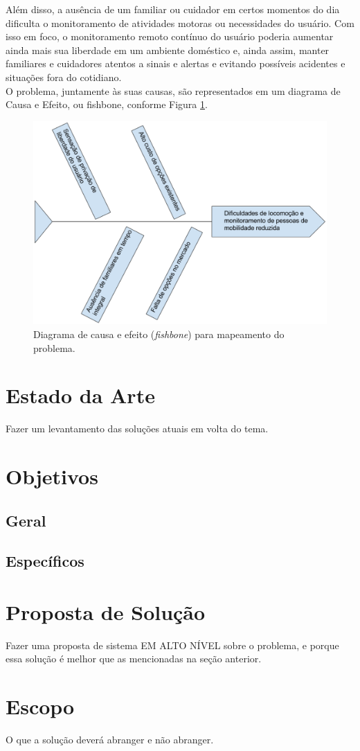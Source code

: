 Além disso, a ausência de um familiar ou cuidador em certos momentos 
do dia 
dificulta o monitoramento de atividades motoras ou necessidades 
do usuário. 
Com isso em foco, o monitoramento remoto contínuo do usuário 
poderia 
aumentar ainda mais sua liberdade em um ambiente doméstico e, ainda 
assim, 
manter familiares e cuidadores atentos a sinais e alertas e evitando 
possíveis 
acidentes e situações fora do cotidiano.\\
	
O problema, juntamente às suas causas, são representados em um diagrama 
de Causa e Efeito, ou fishbone, conforme Figura \ref{fishbone}.
	
\begin{figure}[h]
    \centering
    \label{fishbone}
    \includegraphics[keepaspectratio=true,scale=0.5]{figuras/fishbone.eps}
    \caption{Diagrama de causa e efeito (\textit{fishbone}) para mapeamento do problema.}
\end{figure}


\section{Estado da Arte}

Fazer um levantamento das soluções atuais em volta do tema.

\section{Objetivos}

\subsection{Geral}

\subsection{Específicos}

\section{Proposta de Solução}

Fazer uma proposta de sistema EM ALTO NÍVEL sobre o problema, e porque essa solução é melhor que as mencionadas na seção anterior.

\section{Escopo}

O que a solução deverá abranger e não abranger.
